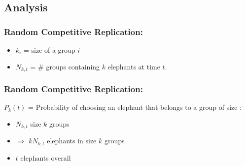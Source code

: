 \subsection{Analysis}

\begin{frame}
  \frametitle{Random Competitive Replication:}

  \begin{block}{}
  \begin{itemize}
    \item<1-> $k_i$ = size of a group $i$
    \item<2-> $N_{k,t}$ = \# groups containing $k$ elephants at time $t$.
  \end{itemize}

  \bigskip


  \bigskip

  \end{block}

\end{frame}

\begin{frame}
  \frametitle{Random Competitive Replication:}

  \begin{block}{}
  $P_k(t)$ = Probability of choosing an elephant that belongs
  to a group of size :

  \begin{itemize}
  \item <2-> $N_{k,t}$ size $k$ groups
  \item <3-> $\Rightarrow$ $kN_{k,t}$ elephants in size $k$ groups
  \item <4-> $t$ elephants overall
  \end{itemize}
  \end{block}

\end{frame}

